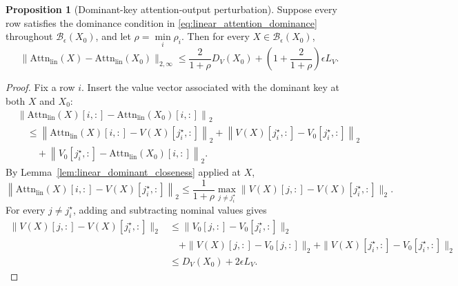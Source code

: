 \documentclass{article}
\theoremstyle{definition}
\newtheorem{proposition}[theorem]{Proposition}
\begin{document}
\begin{proposition}[Dominant-key attention-output perturbation]
\label{prop:linear_attention_perturbation}
Suppose every row satisfies the dominance condition in \eqref{eq:linear_attention_dominance} throughout $\mathcal B_\epsilon(X_0)$, and let $\rho=\min\limits_i\rho_i$. Then for every $X\in\mathcal B_\epsilon(X_0)$,
\begin{equation}
    \|\mathrm{Attn}_{\mathrm{lin}}(X)-\mathrm{Attn}_{\mathrm{lin}}(X_0)\|_{2,\infty}
    \leq
    \frac{2}{1+\rho}D_V(X_0)
    +
    \left(
        1+\frac{2}{1+\rho}
    \right)
    \epsilon L_V.
    \label{eq:app_linear_attention_bound}
\end{equation}
\end{proposition}

\begin{proof}
Fix a row $i$. Insert the value vector associated with the dominant key at both $X$ and $X_0$:
\begin{equation}
\begin{aligned}
    &\left\|
    \mathrm{Attn}_{\mathrm{lin}}(X)[i,:]
    -
    \mathrm{Attn}_{\mathrm{lin}}(X_0)[i,:]
    \right\|_2 \\
    &\quad\leq
    \left\|
    \mathrm{Attn}_{\mathrm{lin}}(X)[i,:]-V(X)[j_i^\star,:]
    \right\|_2
    +
    \left\|
    V(X)[j_i^\star,:]-V_0[j_i^\star,:]
    \right\|_2 \\
    &\qquad+
    \left\|
    V_0[j_i^\star,:]-\mathrm{Attn}_{\mathrm{lin}}(X_0)[i,:]
    \right\|_2.
\end{aligned}
\label{eq:app_linear_three_terms}
\end{equation}
By Lemma~\ref{lem:linear_dominant_closeness} applied at $X$,
\begin{equation}
    \left\|
    \mathrm{Attn}_{\mathrm{lin}}(X)[i,:]-V(X)[j_i^\star,:]
    \right\|_2
    \leq
    \frac{1}{1+\rho}
    \max_{j\neq j_i^\star}
    \|V(X)[j,:]-V(X)[j_i^\star,:]\|_2.
    \label{eq:app_linear_term_A}
\end{equation}
For every $j\neq j_i^\star$, adding and subtracting nominal values gives
\begin{equation}
\begin{aligned}
    \|V(X)[j,:]-V(X)[j_i^\star,:]\|_2
    &\leq
    \|V_0[j,:]-V_0[j_i^\star,:]\|_2 \\
    &\quad+
    \|V(X)[j,:]-V_0[j,:]\|_2
    +
    \|V(X)[j_i^\star,:]-V_0[j_i^\star,:]\|_2 \\
    &\leq
    D_V(X_0)
    +
    2\epsilon L_V.
\end{aligned}

\end{equation}
\end{proof}
\end{document}
